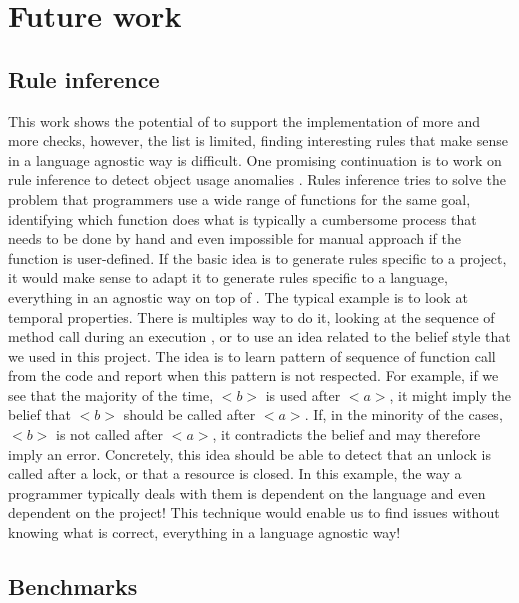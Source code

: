 \section{Future work}
\label{sec:future_work}

\subsection{Rule inference}
\label{subsec:rule_inference}

This work shows the potential of \slang{} to support the implementation of more and more checks, however, the list is limited, finding interesting rules that make sense in a language agnostic way is difficult. 
One promising continuation is to work on rule inference to detect object usage anomalies \cite{Wasylkowski:2007:DOU:1287624.1287632}. \newline
Rules inference tries to solve the problem that programmers use a wide range of functions for the same goal, identifying which function does what is typically a cumbersome process that needs to be done by hand and even impossible for manual approach if the function is user-defined. 
If the basic idea is to generate rules specific to a project, it would make sense to adapt it to generate rules specific to a language, everything in an agnostic way on top of \slang{}. 
The typical example is to look at temporal properties. 
There is multiples way to do it, looking at the sequence of method call during an execution \cite{Gabel:2010:OIE:1806799.1806806}, or to use an idea related to the belief style \cite{Engler:2001:BDB:502059.502041} that we used in this project. 
The idea is to learn pattern of sequence of function call from the code and report when this pattern is not respected.
For example, if we see that the majority of the time, \emph{$<b>$} is used after \emph{$<a>$}, it might imply the belief that \emph{$<b>$} should be called after \emph{$<a>$}. If, in the minority of the cases, \emph{$<b>$} is not called after \emph{$<a>$}, it contradicts the belief and may therefore imply an error. 
Concretely, this idea should be able to detect that an unlock is called after a lock, or that a resource is closed. 
In this example, the way a programmer typically deals with them is dependent on the language and even dependent on the project! \newline
This technique would enable us to find issues without knowing what is correct, everything in a language agnostic way!

\subsection{Benchmarks}
\label{subsec:benchmarks}

